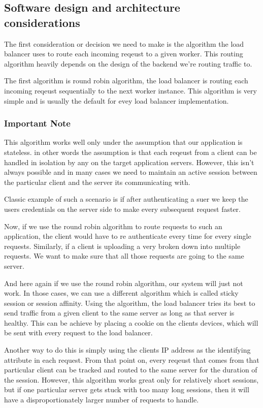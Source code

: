 \documentclass[a4paper, 11pt]{book}
\begin{document}
    \subsection{Software design and architecture considerations}
    The first consideration or decision we need to make is the algorithm the load balancer uses to route each incoming reqeust to a given worker.
    This routing algorithm heavily depends on the design of the backend we're routing traffic to.

    The first algorithm is round robin algorithm, the load balancer is routing each incoming reqeust sequentially to the next worker instance.
    This algorithm is very simple and is usually the default for evey load balancer implementation.

    \subsubsection{Important Note} This algorithm works well only under the assumption that our application is stateless.
    in other words the assumption is that each reqeust from a client can be handled in isolation by any on the target application servers.
    However, this isn't always possible and in many cases we need to maintain an active session between the particular client and the server its communicating with.

    Classic example of such a scenario is if after authenticating a suer we keep the users credentials on the server side to make every subsequent request faster.

    Now, if we use the round robin algorithm to route requests to such an application, the client would have to re authenticate every time for every single requests.
    Similarly, if a client is uploading a very broken down into multiple requests.
    We want to make sure that all those requests are going to the same server.

    And here again if we use the round robin algorithm, our system will just not work.
    In those cases, we can use a different algorithm which is called sticky session or session affinity.
    Using the algorithm, the load balancer tries its best to send traffic from a given client to the same server as long as that server is healthy.
    This can be achieve by placing a cookie on the clients devices, which will be sent with every request to the load balancer.

    Another way to do this is simply using the clients IP address as the identifying attribute in each request.
    From that point on, every reqeust that comes from that particular client can be tracked and routed to the same server for the duration of the session.
    However, this algorithm works great only for relatively short sessions, but if one particular server gets stuck with too many long sessions, then it will have a disproportionately larger number of requests to handle.
\end{document}
